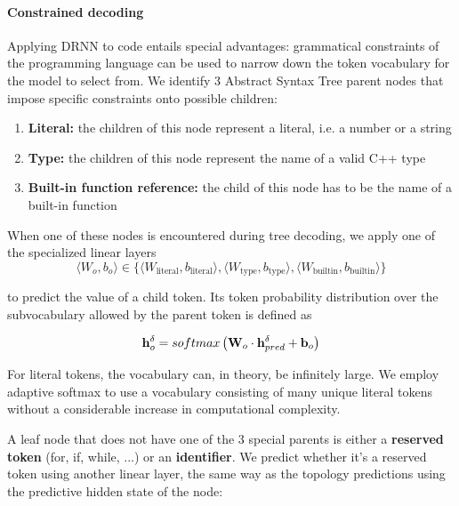 \paragraph{Constrained decoding}
Applying DRNN \cite{alvarez-melisTreestructuredDecodingDoublyrecurrent2017} to code entails special advantages: grammatical constraints of the programming language can be used to narrow down the token vocabulary for the model to select from.
We identify 3 Abstract Syntax Tree parent nodes that impose specific constraints onto possible children:

\begin{enumerate}
    \item \textbf{Literal:} the children of this node represent a literal, i.e. a number or a string
    \item \textbf{Type:} the children of this node represent the name of a valid C++ type
    \item \textbf{Built-in function reference:} the child of this node has to be the name of a built-in function
\end{enumerate}

When one of these nodes is encountered during tree decoding, we apply one of the specialized linear layers
\begin{equation}
\langle W_o,b_o \rangle \in \{\langle W_\text{literal},b_\text{literal} \rangle, \langle W_\text{type},b_\text{type} \rangle, \langle W_\text{builtin},b_\text{builtin} \rangle \}
\end{equation}

to predict the value of a child token. Its token probability distribution over the subvocabulary allowed by the parent token is defined as

\begin{align}
    \mathbf{h}_o^\delta =  softmax\left(\mathbf{W}_o \cdot \mathbf{h}_{pred}^\delta + \mathbf{b}_{o}\right) \label{eq:label_pred}
\end{align}

For literal tokens, the vocabulary can, in theory, be infinitely large. We employ adaptive softmax \cite{graveEfficientSoftmaxApproximation2017} to use a vocabulary consisting of many unique literal tokens without a considerable increase in computational complexity.

A leaf node that does not have one of the 3 special parents is either a \textbf{reserved token} (for, if, while, ...) or an \textbf{identifier}. We predict whether it's a reserved token using another linear layer, the same way as the topology predictions using the predictive hidden state of the node: 

